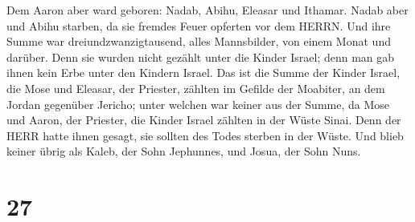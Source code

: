 Dem Aaron aber ward geboren: Nadab, Abihu, Eleasar und Ithamar.
 Nadab aber und Abihu starben, da sie fremdes Feuer
opferten vor dem HERRN.  Und ihre Summe war
dreiundzwanzigtausend, alles Mannsbilder, von einem Monat und darüber.
Denn sie wurden nicht gezählt unter die Kinder Israel; denn man gab
ihnen kein Erbe unter den Kindern Israel.  Das ist die
Summe der Kinder Israel, die Mose und Eleasar, der Priester, zählten im
Gefilde der Moabiter, an dem Jordan gegenüber Jericho; 
unter welchen war keiner aus der Summe, da Mose und Aaron, der Priester,
die Kinder Israel zählten in der Wüste Sinai.  Denn der
HERR hatte ihnen gesagt, sie sollten des Todes sterben in der Wüste. Und
blieb keiner übrig als Kaleb, der Sohn Jephunnes, und Josua, der Sohn
Nuns.

\hypertarget{section-26}{%
\section{27}\label{section-26}}

